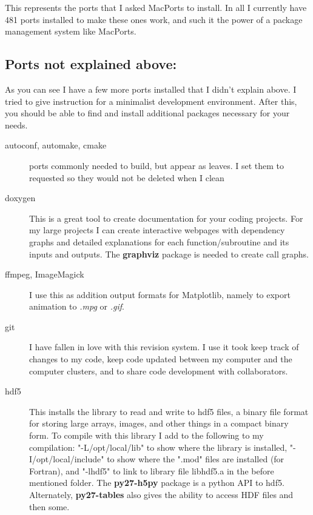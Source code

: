 \documentclass[11pt, A4paper]{article}
\begin{document}
This represents the ports that I asked MacPorts to install. In all I currently have 481 ports installed to make these ones work, and such it the power of a package management system like MacPorts. 

\subsection*{Ports not explained above:}

As you can see I have a few more ports installed that I didn't explain above. I tried to give instruction for a minimalist development environment. After this, you should be able to find and install additional packages necessary for your needs.

\begin{description}

\item[autoconf, automake, cmake] ports commonly needed to build, but appear as leaves. I set them to requested so they would not be deleted when I clean

\item[doxygen] This is a great tool to create documentation for your coding projects.
For my large projects I can create interactive webpages with dependency graphs and detailed explanations for each function/subroutine and its inputs and outputs. 
The {\bf graphviz} package is needed to create call graphs.

\item[ffmpeg, ImageMagick] I use this as addition output formats for Matplotlib, namely to export animation to {\it .mpg} or {\it .gif}.
 
\item[git] I have fallen in love with this revision system. 
I use it took keep track of changes to my code, keep code updated between my computer and the computer clusters, and to share code development with collaborators.

\item[hdf5] This installs the library to read and write to hdf5 files, a binary file format for storing large arrays, images, and other things in a compact binary form. 
To compile with this library I add to the following to my compilation: "-L/opt/local/lib" to show where the library is installed, "-I/opt/local/include" to show where the ".mod" files are installed (for Fortran), and "-lhdf5" to link to library file libhdf5.a in the before mentioned folder. 
The {\bf py27-h5py} package is a python API to hdf5. Alternately, {\bf py27-tables} also gives the ability to access HDF files and then some.


\end{description}
\end{document}
